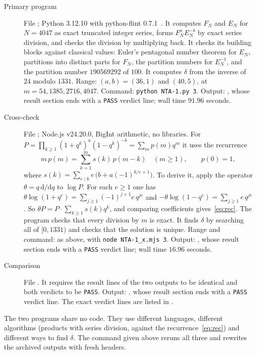 \documentclass[11pt]{amsart}
\theoremstyle{definition}
\theoremstyle{remark}
\begin{document}
\begin{description}
\item[Primary program] File ; Python 3.12.10 with python-flint 0.7.1~\cite{flint}. It computes \(F_N\) and \(E_N\) for \(N=4047\) as exact truncated integer series, forms \(F_N^{a}E_N^{-b}\) by exact series division, and checks the division by multiplying back. It checks its building blocks against classical values: Euler's pentagonal number theorem for \(E_N\), partitions into distinct parts for \(F_N\), the partition numbers for \(E_N^{-1}\), and the partition number \(190569292\) of \(100\). It computes \(\delta\) from the inverse of \(24\) modulo \(1331\). Range: \((a,b)=(36,1)\) and \((40,5)\), at \(m=54,1385,2716,4047\). Command: \texttt{python NTA-1.py 3}. Output: , whose result section ends with a \texttt{PASS} verdict line; wall time \(91.96\) seconds.
\item[Cross-check] File ; Node.js v24.20.0, BigInt arithmetic, no libraries. For \(P=\prod_{k\ge1}(1+q^k)^{a}(1-q^k)^{-b}=\sum_m p(m)q^m\) it uses the recurrence
\begin{equation}\label{eq:rec}
m\,p(m)=\sum_{k=1}^{m}s(k)\,p(m-k)\quad(m\ge1),\qquad p(0)=1,
\end{equation}
where \(s(k)=\sum_{e\mid k}e\,\bigl(b+a(-1)^{k/e+1}\bigr)\). To derive it, apply the operator \(\theta=q\,\mathrm{d}/\mathrm{d}q\) to \(\log P\). For each \(e\ge1\) one has \(\theta\log(1+q^e)=\sum_{j\ge1}(-1)^{j+1}e\,q^{je}\) and \(-\theta\log(1-q^e)=\sum_{j\ge1}e\,q^{je}\). So \(\theta P=P\cdot\sum_{k\ge1}s(k)q^k\), and comparing coefficients gives~\eqref{eq:rec}. The program checks that every division by \(m\) is exact. It finds \(\delta\) by searching all of \([0,1331)\) and checks that the solution is unique. Range and command: as above, with \texttt{node NTA-1\_x.mjs 3}. Output: , whose result section ends with a \texttt{PASS} verdict line; wall time \(16.96\) seconds.
\item[Comparison] File . It requires the result lines of the two outputs to be identical and both verdicts to be \texttt{PASS}. Output: , whose result section ends with a \texttt{PASS} verdict line. The exact verdict lines are listed in .
\end{description}

The two programs share no code. They use different languages, different algorithms (products with series division, against the recurrence~\eqref{eq:rec}) and different ways to find \(\delta\). The command given above reruns all three and rewrites the archived outputs with fresh headers.
\end{document}
